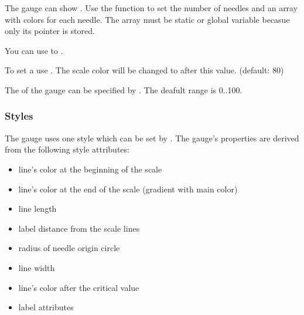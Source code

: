 \documentclass[letterpaper,10pt,english]{sphinxmanual}
\begin{document}
The gauge can show .
Use the  function to set the number of needles and an array with colors for each needle. The array must be static or global variable becasue only its pointer is stored.

You can use  to .

To set a  use . The scale color will be changed to  after this value. (default: 80)

The  of the gauge can be specified by . The deafult range is 0..100.


\subsubsection{Styles}
\label{\detokenize{object-types/gauge:styles}}
The gauge uses one style which can be set by . The gauge’s properties are derived from the following style attributes:
\begin{itemize}
\item {} 
 line’s color at the beginning of the scale

\item {} 
 line’s color at the end of the scale (gradient with main color)

\item {} 
 line length

\item {} 
 label distance from the scale lines

\item {} 
 radius of needle origin circle

\item {} 
 line width

\item {} 
 line’s color after the critical value

\item {} 
 label attributes

\end{itemize}
\end{document}
